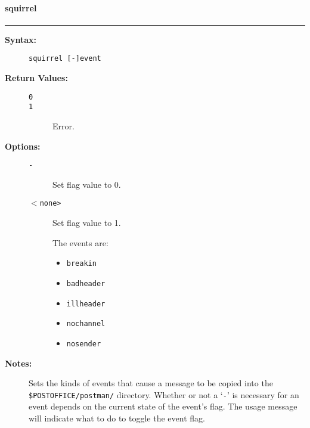 \vspace {2pt}


\paragraph{squirrel}

\hrule
\begin{description}
\item[{\bf Syntax:}] \mbox{}

{\tt squirrel [-]event}

\item[{\bf Return Values:}] \mbox{}

\begin{description}
\item[{\tt 0}] \mbox{}



\item[{\tt 1}] \mbox{}

Error.

\end{description}


\item[{\bf Options:}] \mbox{}

\begin{description}
\item[{\tt -}] \mbox{}

Set flag value to 0.

\item[{\tt {\(<\)}none>}] \mbox{}

Set flag value to 1. 

The events are: 
\begin{itemize}
\item {\tt breakin}
\item {\tt badheader}
\item {\tt illheader}
\item {\tt nochannel}
\item {\tt nosender}
\end{itemize}


\end{description}


\item[{\bf Notes:}] \mbox{}

Sets the kinds of events that cause a message 
to be copied into the {\tt \$POSTOFFICE/postman/} directory. 
Whether or not a `{\tt -}' is necessary for an event depends on 
the current state of the event's flag. The usage message will 
indicate what to do to toggle the event flag. 

\end{description}


